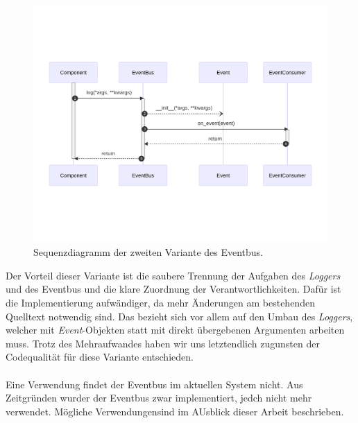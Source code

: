 \begin{figure}[H]
	\centering
	\includegraphics[width=1.0\linewidth]{images/diagrams/eventbus-v2-seq.png}
	\caption{Sequenzdiagramm der zweiten Variante des Eventbus.}
	\label{fig:eventbus-v2-seq}
\end{figure}

Der Vorteil dieser Variante ist die saubere Trennung der Aufgaben des \emph{Loggers} und des Eventbus und die klare Zuordnung der Verantwortlichkeiten. Dafür ist die Implementierung aufwändiger, da mehr Änderungen am bestehenden Quelltext notwendig sind. Das bezieht sich vor allem auf den Umbau des \emph{Loggers}, welcher mit \emph{Event}-Objekten statt mit direkt übergebenen Argumenten arbeiten muss. Trotz des Mehraufwandes haben wir uns letztendlich zugunsten der Codequalität für diese Variante entschieden.\\
\\
Eine Verwendung findet der Eventbus im aktuellen System nicht. Aus Zeitgründen wurder der Eventbus zwar implementiert, jedch nicht mehr verwendet. Mögliche Verwendungensind im AUsblick dieser Arbeit beschrieben.